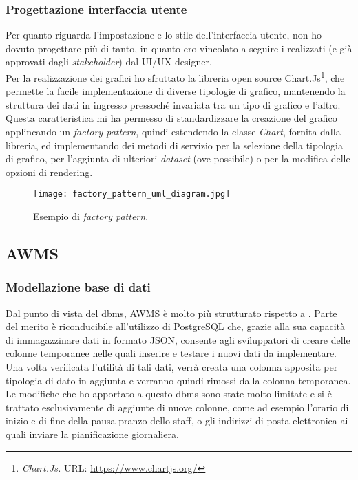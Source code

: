 \subsubsection{Progettazione interfaccia utente}
Per quanto riguarda l'impostazione e lo stile dell'interfaccia utente, non ho dovuto progettare più di tanto, in quanto ero vincolato a seguire i  realizzati (e già approvati dagli \textit{stakeholder}) dal UI/UX designer.\\
Per la realizzazione dei grafici ho sfruttato la libreria \gls{open source} Chart.Js\footnote{\textit{Chart.Js.} URL: \href{https://www.chartjs.org/}{https://www.chartjs.org/}}, che permette la facile implementazione di diverse tipologie di grafico, mantenendo la struttura dei dati in ingresso pressoché invariata tra un tipo di grafico e l'altro. 
Questa caratteristica mi ha permesso di standardizzare la creazione del grafico applincando un \textit{factory pattern}, quindi estendendo la classe \textit{Chart}, fornita dalla libreria, ed implementando dei metodi di servizio per la selezione della tipologia di grafico, per l'aggiunta di ulteriori \textit{dataset} (ove possibile) o per la modifica delle opzioni di rendering.
\begin{figure}[h]
\texttt{[image: factory\_pattern\_uml\_diagram.jpg]}
\centering
\caption{Esempio di \textit{factory pattern}.}
\label{fig:factory-pattern}
\end{figure}


\subsection{AWMS}
\subsubsection{Modellazione base di dati}
Dal punto di vista del \acrshort{dbms}, AWMS è molto più strutturato rispetto a \DS{}. Parte del merito è riconducibile all'utilizzo di PostgreSQL che, grazie alla sua capacità di immagazzinare dati in formato JSON, consente agli sviluppatori di creare delle colonne temporanee nelle quali inserire e testare i nuovi dati da implementare. Una volta verificata l'utilità di tali dati, verrà creata una colonna apposita per tipologia di dato in aggiunta e verranno quindi rimossi dalla colonna temporanea.\\
Le modifiche che ho apportato a questo \acrshort{dbms} sono state molto limitate e si è trattato esclusivamente di aggiunte di nuove colonne, come ad esempio l'orario di inizio e di fine della pausa pranzo dello staff, o gli indirizzi di posta elettronica ai quali inviare la pianificazione giornaliera.  
